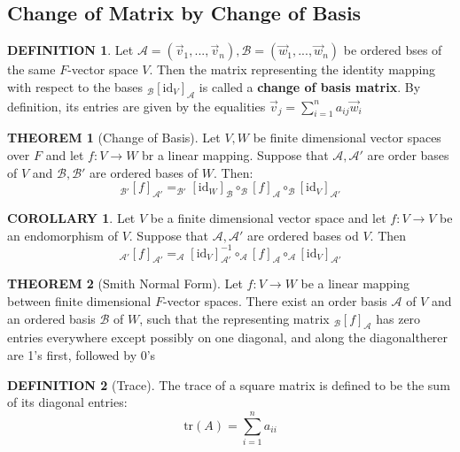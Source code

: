 \documentclass[12pt]{article}
\theoremstyle{definition}
\newtheorem{definition}{DEFINITION}[subsection]
\newtheorem{theorem}{THEOREM}[subsection]
\newcommand{\vect}[1]{\overrightarrow{#1}}
\newtheorem{corollary}{COROLLARY}[subsection]
\begin{document}
\subsection{Change of Matrix by Change of Basis}
\begin{definition}
    Let $\mathcal{A} = (\vect{v}_1,...,\vect{v}_n), \mathcal{B} = (\vect{w}_1,...,\vect{w}_n)$ be ordered bses of the same $F$-vector space $V$. Then the matrix representing the identity mapping with respect to the bases $_\mathcal{B}[\text{id}_V]_\mathcal{A}$ is called a \textbf{change of basis matrix}. By definition, its entries are given by the equalities $\vect{v}_j = \sum_{i=1}^n{a_{ij}\vect{w}_i}$
\end{definition}

\begin{theorem}[Change of Basis]
    Let $V,W$ be finite dimensional vector spaces over $F$ and let $f:V \rightarrow W$ br a linear mapping. Suppose that $\mathcal{A,A'}$ are order bases of $V$ and $\mathcal{B,B'}$ are ordered bases of $W$. Then:
    $$_\mathcal{B'}[f]_\mathcal{A'} = _\mathcal{B'}[\text{id}_W]_\mathcal{B} \circ _\mathcal{B}[f]_\mathcal{A} \circ _\mathcal{B}[\text{id}_V]_\mathcal{A'}$$
\end{theorem}

\begin{corollary}
    Let $V$ be a finite dimensional vector space and let $f:V\rightarrow V$ be an endomorphism of $V$. Suppose that $\mathcal{A,A'}$ are ordered bases od $V$. Then 
    $$_\mathcal{A'}[f]_\mathcal{A'} = _\mathcal{A}[\text{id}_V]_\mathcal{A'}^{-1} \circ _\mathcal{A}[f]_\mathcal{A} \circ _\mathcal{A}[\text{id}_V]_\mathcal{A'}$$
\end{corollary}

\begin{theorem}[Smith Normal Form]
    Let $f:V\rightarrow W$ be a linear mapping between finite dimensional $F$-vector spaces. There exist an order basis $\mathcal{A}$ of $V$ and an ordered basis $\mathcal{B}$ of $W$, such that the representing matrix $_\mathcal{B}[f]_\mathcal{A}$ has zero entries everywhere except possibly on one diagonal, and along the diagonaltherer are 1's first, followed by 0's  
\end{theorem}

\begin{definition}[Trace]
    The trace of a square matrix is defined to be the sum of its diagonal entries:
    $$\text{tr}(A) = \sum_{i=1}^{n}{a_{ii}}$$
\end{definition}
\end{document}
